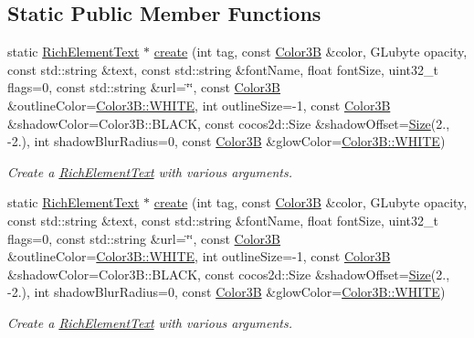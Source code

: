 \subsection*{Static Public Member Functions}
\begin{DoxyCompactItemize}
\item 
static \hyperlink{classui_1_1RichElementText}{Rich\+Element\+Text} $\ast$ \hyperlink{classui_1_1RichElementText_a47319954085ea39d049f820662129ce0}{create} (int tag, const \hyperlink{structColor3B}{Color3B} \&color, G\+Lubyte opacity, const std\+::string \&text, const std\+::string \&font\+Name, float font\+Size, uint32\+\_\+t flags=0, const std\+::string \&url=\char`\"{}\char`\"{}, const \hyperlink{structColor3B}{Color3B} \&outline\+Color=\hyperlink{structColor3B_adf57cb86ca15f434b29215ad471cdc35}{Color3\+B\+::\+W\+H\+I\+TE}, int outline\+Size=-\/1, const \hyperlink{structColor3B}{Color3B} \&shadow\+Color=Color3\+B\+::\+B\+L\+A\+CK, const cocos2d\+::\+Size \&shadow\+Offset=\hyperlink{classSize}{Size}(2., -\/2.), int shadow\+Blur\+Radius=0, const \hyperlink{structColor3B}{Color3B} \&glow\+Color=\hyperlink{structColor3B_adf57cb86ca15f434b29215ad471cdc35}{Color3\+B\+::\+W\+H\+I\+TE})
\begin{DoxyCompactList}\small\item\em Create a \hyperlink{classui_1_1RichElementText}{Rich\+Element\+Text} with various arguments. \end{DoxyCompactList}\item 
static \hyperlink{classui_1_1RichElementText}{Rich\+Element\+Text} $\ast$ \hyperlink{classui_1_1RichElementText_a47319954085ea39d049f820662129ce0}{create} (int tag, const \hyperlink{structColor3B}{Color3B} \&color, G\+Lubyte opacity, const std\+::string \&text, const std\+::string \&font\+Name, float font\+Size, uint32\+\_\+t flags=0, const std\+::string \&url=\char`\"{}\char`\"{}, const \hyperlink{structColor3B}{Color3B} \&outline\+Color=\hyperlink{structColor3B_adf57cb86ca15f434b29215ad471cdc35}{Color3\+B\+::\+W\+H\+I\+TE}, int outline\+Size=-\/1, const \hyperlink{structColor3B}{Color3B} \&shadow\+Color=Color3\+B\+::\+B\+L\+A\+CK, const cocos2d\+::\+Size \&shadow\+Offset=\hyperlink{classSize}{Size}(2., -\/2.), int shadow\+Blur\+Radius=0, const \hyperlink{structColor3B}{Color3B} \&glow\+Color=\hyperlink{structColor3B_adf57cb86ca15f434b29215ad471cdc35}{Color3\+B\+::\+W\+H\+I\+TE})
\begin{DoxyCompactList}\small\item\em Create a \hyperlink{classui_1_1RichElementText}{Rich\+Element\+Text} with various arguments. \end{DoxyCompactList}\end{DoxyCompactItemize}
